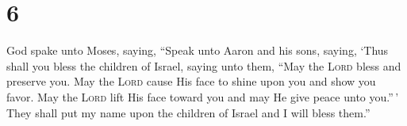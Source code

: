\section{6}
\begin{enumerate}[align=center]
     God spake unto Moses, saying,%
     ``Speak unto Aaron and his sons, saying, `Thus shall you bless the children of Israel, saying unto them,%
     ``May the \textsc{Lord} bless and preserve you.%
     May the \textsc{Lord} cause His face to shine upon you and show you favor.%
     May the \textsc{Lord} lift His face toward you and may He give peace unto you.''\,'%
     They shall put my name upon the children of Israel and I will bless them.''%
\end{enumerate}
